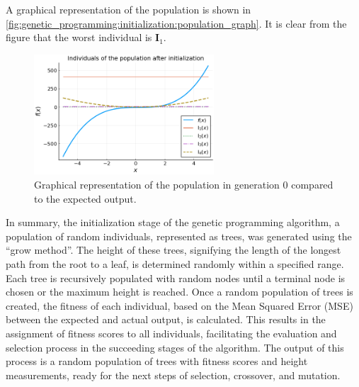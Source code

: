   A graphical representation of the population is shown in
  \vref{fig:genetic_programming:initialization:population_graph}.
  It is clear from the figure that the worst individual is \(\mathbf{I}_1\).

  \begin{figure}[ht!]
    \centering
    \includegraphics[width=0.6\textwidth]{img/theoretical_framework/gp_pop_init.png}
    \caption{
      Graphical representation of the population in generation 0 compared to the
      expected output.
    }
    \label{fig:genetic_programming:initialization:population_graph}
  \end{figure}

  
  In summary, the initialization stage of the genetic programming algorithm, a 
  population of random individuals, represented as trees, was generated using 
  the \enquote{grow method}.
  The height of these trees, signifying the length of the longest path from the
  root to a leaf, is determined randomly within a specified range.
  Each tree is recursively populated with random nodes until a terminal node is
  chosen or the maximum height is reached.
  Once a random population of trees is created, the fitness of each individual,
  based on the Mean Squared Error (MSE) between the expected and actual output,
  is calculated.
  This results in the assignment of fitness scores to all individuals,
  facilitating the evaluation and selection process in the succeeding stages of
  the algorithm.
  The output of this process is a random population of trees with fitness scores
  and height measurements, ready for the next steps of selection, crossover, and
  mutation.
